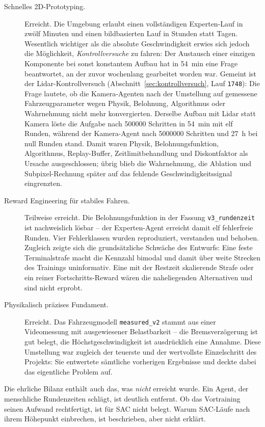 \begin{description}
  \item[Schnelles 2D-Prototyping.] Erreicht. Die Umgebung erlaubt einen vollständigen Experten-Lauf in zwölf Minuten und einen bildbasierten Lauf in Stunden statt Tagen. Wesentlich wichtiger als die absolute Geschwindigkeit erwies sich jedoch die Möglichkeit, \emph{Kontrollversuche} zu fahren: Der Austausch einer einzigen Komponente bei sonst konstantem Aufbau hat in \SI{54}{\minute} eine Frage beantwortet, an der zuvor wochenlang gearbeitet worden war. Gemeint ist der Lidar-Kontrollversuch (Abschnitt~\ref{sec:kontrollversuch}, Lauf \texttt{1748}): Die Frage lautete, ob die Kamera-Agenten nach der Umstellung auf gemessene Fahrzeugparameter wegen Physik, Belohnung, Algorithmus oder Wahrnehmung nicht mehr konvergierten. Derselbe Aufbau mit Lidar statt Kamera löste die Aufgabe nach \num{500000} Schritten in \SI{54}{\minute} mit elf Runden, während der Kamera-Agent nach \num{5000000} Schritten und \SI{27}{\hour} bei null Runden stand. Damit waren Physik, Belohnungsfunktion, Algorithmus, Replay-Buffer, Zeitlimitbehandlung und Diskontfaktor als Ursache ausgeschlossen; übrig blieb die Wahrnehmung, die Ablation und Subpixel-Rechnung später auf das fehlende Geschwindigkeitssignal eingrenzten.
  \item[Reward Engineering für stabiles Fahren.] Teilweise erreicht. Die Belohnungsfunktion in der Fassung \texttt{v3\_\-rundenzeit} ist nachweislich lösbar -- der Experten-Agent erreicht damit elf fehlerfreie Runden. Vier Fehlerklassen wurden reproduziert, verstanden und behoben. Zugleich zeigte sich die grundsätzliche Schwäche des Entwurfs: Eine feste Terminalstrafe macht die Kennzahl bimodal und damit über weite Strecken des Trainings uninformativ. Eine mit der Restzeit skalierende Strafe oder ein reiner Fortschritts-Reward wären die naheliegenden Alternativen und sind nicht erprobt.
  \item[Physikalisch präzises Fundament.] Erreicht. Das Fahrzeugmodell \texttt{measured\_v2} stammt aus einer Videomessung mit ausgewiesener Belastbarkeit -- die Bremsverzögerung ist gut belegt, die Höchstgeschwindigkeit ist ausdrücklich eine Annahme. Diese Umstellung war zugleich der teuerste und der wertvollste Einzelschritt des Projekts: Sie entwertete sämtliche vorherigen Ergebnisse und deckte dabei das eigentliche Problem auf.
\end{description}

Die ehrliche Bilanz enthält auch das, was \emph{nicht} erreicht wurde. Ein Agent, der menschliche Rundenzeiten schlägt, ist deutlich entfernt. Ob das Vortraining seinen Aufwand rechtfertigt, ist für \ac{SAC} nicht belegt. Warum \ac{SAC}-Läufe nach ihrem Höhepunkt einbrechen, ist beschrieben, aber nicht erklärt.

